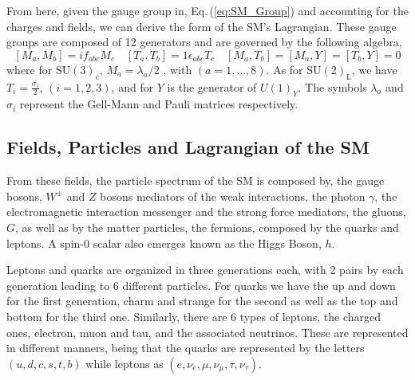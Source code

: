 %
From here, given the gauge group in, Eq.\,(\ref{eq:SM_Group}) and accounting for the charges and fields, we can derive the form of the SM's Lagrangian. These gauge groups are composed of 12 generators and are governed by the following algebra, 
% 
\begin{equation}
\left[ M_a , M_b \right] = i f_{abc} M_c \quad \left[ T_a , T_b \right] = 1 \epsilon_{abc} T_c \quad \left[ M_a , T_b \right] = \left[ M_a , Y \right] = \left[ T_b,Y \right] = 0 
\end{equation}
%
where for $\mathrm{SU(3)_c}$, $M_a = {\lambda_a}/{2}$ , with $(a = 1, . . . , 8)$. As for $\mathrm{SU(2)_L}$, we have $T_i= \frac{\sigma_i}{2} $, $(i = 1, 2, 3)$, and for $Y$ is the generator of $U(1)_Y$. The symbols $\lambda_a$ and $\sigma_i$ represent the Gell-Mann and Pauli matrices respectively. 

\subsection{Fields, Particles and Lagrangian of the SM}

From these fields, the particle spectrum of the SM is composed by, the gauge bosons, $W^\pm$ and $Z$ bosons mediators of the weak interactions, the photon $\gamma$, the electromagnetic interaction messenger and the strong force mediators, the gluons, $G$, as well as by the matter particles, the fermions, composed by the quarks and leptons. A spin-0 scalar also emerges known as the Higgs Boson, $h$. 

Leptons and quarks are organized in three generations each, with 2 pairs by each generation leading to 6 different particles. 
%
For quarks we have the up and down for the first generation, charm and strange for the second as well as the top and bottom for the third one. 
%
Similarly, there are 6 types of leptons, the charged ones, electron, muon and tau, and the associated neutrinos. These are represented in different manners, being that the quarks are represented by the letters $(u,d,c,s,t,b)$ while leptons as $(e,\nu_{e},\mu,\nu_{\mu},\tau,\nu_{\tau})$. 

